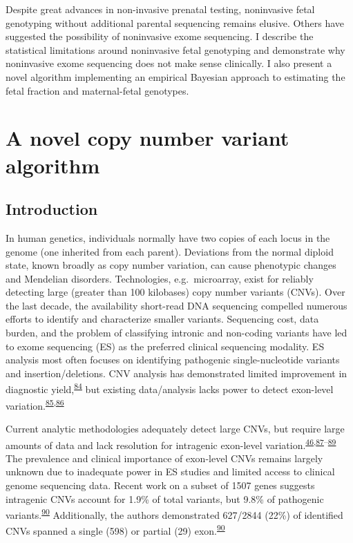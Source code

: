\documentclass[11pt,letterpaper]{book}
\begin{document}
Despite great advances in non-invasive prenatal testing, noninvasive fetal genotyping without additional parental sequencing remains elusive.
Others have suggested the possibility of noninvasive exome sequencing.
I describe the statistical limitations around noninvasive fetal genotyping and demonstrate why noninvasive exome sequencing does not make sense clinically.
I also present a novel algorithm implementing an empirical Bayesian approach to estimating the fetal fraction and maternal-fetal genotypes.

\hypertarget{a-novel-copy-number-variant-algorithm}{%
\chapter{A novel copy number variant algorithm}\label{a-novel-copy-number-variant-algorithm}}

\hypertarget{introduction}{%
\section{Introduction}\label{introduction}}

In human genetics, individuals normally have two copies of each locus in the genome (one inherited from each parent).
Deviations from the normal diploid state, known broadly as copy number variation, can cause phenotypic changes and Mendelian disorders.
Technologies, e.g.~microarray, exist for reliably detecting large (greater than 100 kilobases) copy number variants (CNVs).
Over the last decade, the availability short-read DNA sequencing compelled numerous efforts to identify and characterize smaller variants.
Sequencing cost, data burden, and the problem of classifying intronic and non-coding variants have led to exome sequencing (ES) as the preferred clinical sequencing modality.
ES analysis most often focuses on identifying pathogenic single-nucleotide variants and insertion/deletions.
CNV analysis has demonstrated limited improvement in diagnostic yield,\textsuperscript{\protect\hyperlink{ref-marchuk:2018aa}{84}} but existing data/analysis lacks power to detect exon-level variation.\textsuperscript{\protect\hyperlink{ref-retterer:2015aa}{85},\protect\hyperlink{ref-yao:2017aa}{86}}

Current analytic methodologies adequately detect large CNVs, but require large amounts of data and lack resolution for intragenic exon-level variation.\textsuperscript{\protect\hyperlink{ref-plagnol:2012aa}{46},\protect\hyperlink{ref-fromer:2012aa}{87}--\protect\hyperlink{ref-krumm:2012aa}{89}}
The prevalence and clinical importance of exon-level CNVs remains largely unknown due to inadequate power in ES studies and limited access to clinical genome sequencing data.
Recent work on a subset of 1507 genes suggests intragenic CNVs account for 1.9\% of total variants, but 9.8\% of pathogenic variants.\textsuperscript{\protect\hyperlink{ref-truty:2019aa}{90}}
Additionally, the authors demonstrated 627/2844 (22\%) of identified CNVs spanned a single (598) or partial (29) exon.\textsuperscript{\protect\hyperlink{ref-truty:2019aa}{90}}
\end{document}
